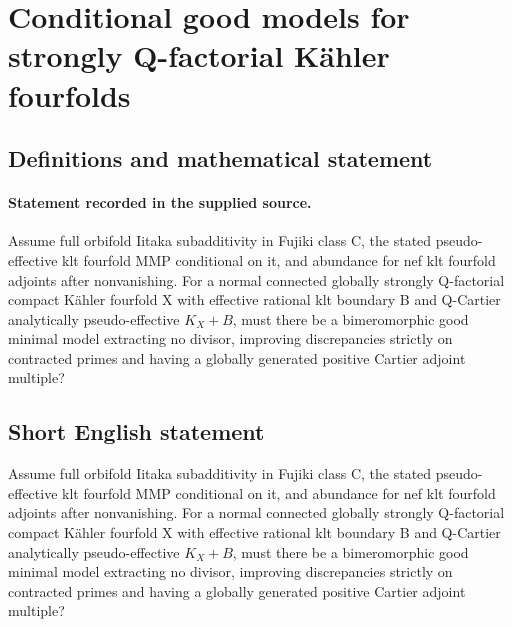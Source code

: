 \documentclass[11pt]{article}
\begin{document}
\section*{Conditional good models for strongly Q-factorial Kähler fourfolds}\label{statement}
\subsection{Definitions and mathematical statement}
\paragraph{Statement recorded in the supplied source.}
Assume full orbifold Iitaka subadditivity in Fujiki class C, the stated pseudo-effective klt fourfold MMP conditional on it, and abundance for nef klt fourfold adjoints after nonvanishing. For a normal connected globally strongly Q-factorial compact Kähler fourfold X with effective rational klt boundary B and Q-Cartier analytically pseudo-effective $K_X+B$, must there be a bimeromorphic good minimal model extracting no divisor, improving discrepancies strictly on contracted primes and having a globally generated positive Cartier adjoint multiple?
\subsection{Short English statement}
Assume full orbifold Iitaka subadditivity in Fujiki class C, the stated pseudo-effective klt fourfold MMP conditional on it, and abundance for nef klt fourfold adjoints after nonvanishing. For a normal connected globally strongly Q-factorial compact Kähler fourfold X with effective rational klt boundary B and Q-Cartier analytically pseudo-effective $K_X+B$, must there be a bimeromorphic good minimal model extracting no divisor, improving discrepancies strictly on contracted primes and having a globally generated positive Cartier adjoint multiple?
\end{document}
